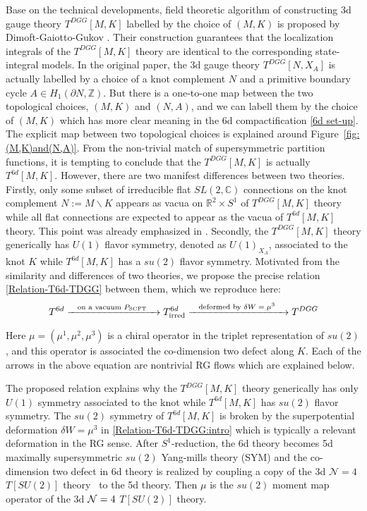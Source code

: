 \documentclass[a4paper,11pt]{article}
\def\CN{{\cal N}}
\begin{document}
Base on  the technical developments,   field theoretic algorithm of constructing  3d gauge theory $T^{DGG}[M,K]$ labelled by  the choice of $(M,K)$ is proposed by Dimoft-Gaiotto-Gukov \cite{Dimofte:2011ju}.  Their construction guarantees that the localization integrals of the  $T^{DGG}[M,K]$ theory are identical to the corresponding state-integral models.  In the original paper, the 3d gauge theory $T^{DGG}[N,X_A]$ is actually labelled by a choice of a knot complement $N$ and  a primitive boundary cycle $A \in H_1 (\partial N , \mathbb{Z})$. But there is a one-to-one map between  the two topological choices, $(M,K)$ and $(N,A)$, and we can labell them by the choice of $(M,K)$ which has more clear meaning in  the 6d compactification \eqref{6d set-up}. The explicit map between two topological choices is explained around Figure~\ref{fig:(M,K)and(N,A)}. 
From the non-trivial match of supersymmetric partition functions,  it is tempting to conclude that the $T^{DGG}[M,K]$ is actually  $T^{6d}[M,K]$. However, there are two manifest differences between two theories. Firstly, only some subset of irreducible flat $SL(2,\mathbb{C})$ connections on the knot complement $N:=M\backslash K$ appears as vacua on $\mathbb{R}^2\times S^1$ of $T^{DGG}[M,K]$ theory while all flat connections are expected to appear as the vacua of $T^{6d}[M,K]$ theory.  This point was already emphasized in \cite{Chung:2014qpa}. Secondly, the $T^{DGG}[M,K]$ theory generically has $U(1)$ flavor symmetry, denoted as $U(1)_{X_A}$,  associated to the knot $K$ while $T^{6d}[M,K]$ has a $su(2)$ flavor symmetry. Motivated from the similarity and differences of two theories, we propose the precise relation \eqref{Relation-T6d-TDGG} between them,
which we reproduce here:
%
\begin{align}
T^{6d} \xrightarrow[\text{}]{\textrm{\quad on a vacuum $P_{\rm SCFT}$} \quad} T^{6d}_{\rm irred} \xrightarrow[\text{}]{\textrm{\quad deformed by $\delta W = \mu^3$} \quad} T^{DGG} \label{Relation-T6d-TDGG:intro}
\end{align}
%
Here $\mu=(\mu^1, \mu^2,\mu^3)$ is
a chiral operator in the triplet representation of $su(2)$, and this operator is associated the co-dimension two defect along $K$. 
Each of the arrows in the above equation are nontrivial RG flows which are explained below.

The proposed relation explains why the $T^{DGG}[M,K]$ theory generically has only $U(1)$ symmetry associated to the knot while $T^{6d}[M,K]$ has  $su(2)$ flavor symmetry. The $su(2)$ symmetry of $T^{6d}[M,K]$ is broken by the superpotential deformation $\delta W = \mu^3$ in \eqref{Relation-T6d-TDGG:intro} which is typically a relevant deformation in the RG sense.   After $S^1$-reduction, the 6d theory becomes 5d maximally supersymmetric $su(2)$ Yang-mills theory (SYM) and the co-dimension two defect in 6d theory is realized by coupling a copy of the 3d $\mathcal{N}=4$ $T[SU(2)]$ theory~\cite{Gaiotto:2008ak} to the 5d theory.  
Then $\mu$ is the $su(2)$ moment map operator of the 3d $\CN=4$ $T[SU(2)]$ theory. 
\end{document}
